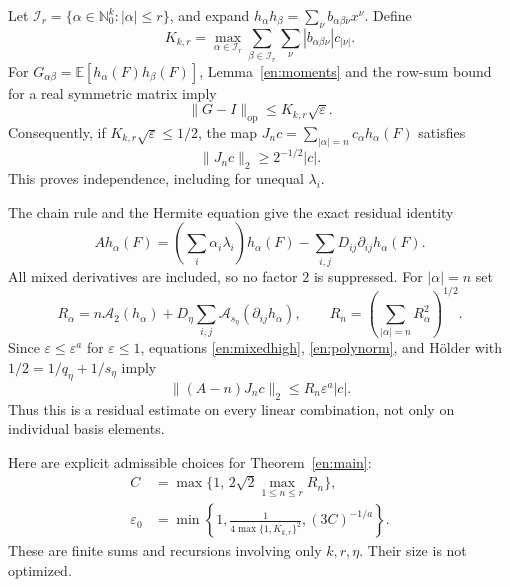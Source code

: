 \documentclass[12pt]{amsart}
\theoremstyle{definition}
\theoremstyle{remark}
\numberwithin{equation}{section}
\newcommand{\N}{\mathbb{N}}
\newcommand{\E}{\mathbb E}
\newcommand{\eps}{\varepsilon}
\theoremstyle{plain}
\begin{document}
Let $\mathcal I_r=\{\alpha\in\N_0^k:|\alpha|\leq r\}$, and expand
$h_\alpha h_\beta=\sum_\nu b_{\alpha\beta\nu}x^\nu$. Define
\begin{equation}\label{en:Gconstant}
 K_{k,r}=\max_{\alpha\in\mathcal I_r}
       \sum_{\beta\in\mathcal I_r}\sum_\nu
                       |b_{\alpha\beta\nu}|c_{|\nu|}.
\end{equation}
For $G_{\alpha\beta}=\E[h_\alpha(F)h_\beta(F)]$, Lemma~\ref{en:moments}
and the row-sum bound for a real symmetric matrix imply
\begin{equation}\label{en:Gram}
 \|G-I\|_{\mathrm{op}}\leq K_{k,r}\sqrt\eps.
\end{equation}
Consequently, if $K_{k,r}\sqrt\eps\leq1/2$, the map
$J_n c=\sum_{|\alpha|=n}c_\alpha h_\alpha(F)$ satisfies
\begin{equation}\label{en:Jbound}
 \|J_nc\|_2\geq2^{-1/2}|c|.
\end{equation}
This proves independence, including for unequal $\lambda_i$.

The chain rule and the Hermite equation give the exact residual identity
\begin{equation}\label{en:residual}
 A h_\alpha(F)=\left(\sum_i\alpha_i\lambda_i\right)h_\alpha(F)
                   -\sum_{i,j}D_{ij}\partial_{ij}h_\alpha(F).
\end{equation}
All mixed derivatives are included, so no factor $2$ is suppressed.
For $|\alpha|=n$ set
\[
 R_\alpha=n\mathcal A_2(h_\alpha)
       +D_\eta\sum_{i,j}\mathcal A_{s_\eta}(\partial_{ij}h_\alpha),
 \qquad R_n=\left(\sum_{|\alpha|=n}R_\alpha^2\right)^{1/2}.
\]
Since $\eps\leq\eps^a$ for $\eps\leq1$, equations
\eqref{en:mixedhigh}, \eqref{en:polynorm}, and H\"older with
$1/2=1/q_\eta+1/s_\eta$ imply
\begin{equation}\label{en:spanresidual}
 \|(A-n)J_nc\|_2\leq R_n\eps^a|c|.
\end{equation}
Thus this is a residual estimate on every linear combination, not only
on individual basis elements.

Here are explicit admissible choices for Theorem~\ref{en:main}:
\begin{equation}\label{en:finalconstants}
 \begin{split}
 C&=\max\{1,\,2\sqrt2\max_{1\leq n\leq r}R_n\},\\
 \eps_0&=\min\left\{1,\frac1{4\max\{1,K_{k,r}\}^2},
                         (3C)^{-1/a}\right\}.
 \end{split}
\end{equation}
These are finite sums and recursions involving only $k,r,\eta$.
Their size is not optimized.
\end{document}
